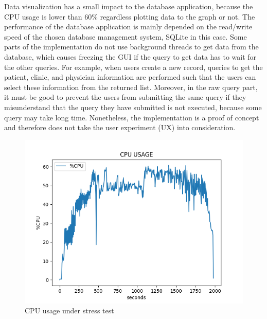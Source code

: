 Data visualization has a small impact to the database application, because the CPU usage is lower than 60\% regardless plotting data to the graph or not. The performance of the database application is mainly depended on the read/write speed of the chosen database management system, SQLite in this case. Some parts of the implementation do not use background threads to get data from the database, which causes freezing the GUI if the query to get data has to wait for the other queries. For example, when users create a new record, queries to get the patient, clinic, and physician information are performed such that the users can select these information from the returned list. Moreover, in the raw query part, it must be good to prevent the users from submitting the same query if they misunderstand that the query they have submitted is not executed, because some query may take long time. Nonetheless, the implementation is a proof of concept and therefore does not take the user experiment (UX) into consideration.
\begin{figure}
    \centering
    \includegraphics[width=1.0\textwidth]{Figures/StressTest.png}
    \caption{CPU usage under stress test}
    \label{fig:Figures/STRESSTEST}
\end{figure}
